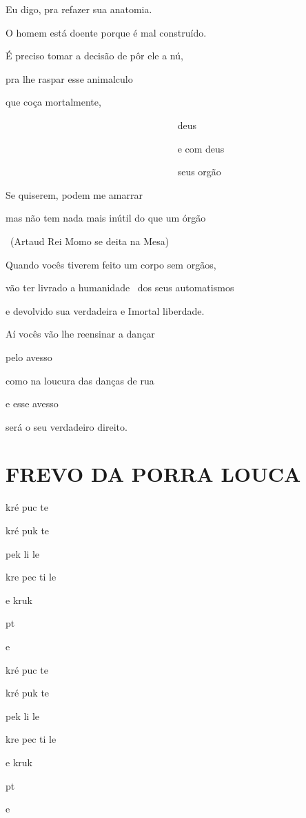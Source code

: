 Eu digo, pra refazer sua anatomia.

O homem está doente porque é mal construído.

É preciso tomar a decisão de pôr ele a nú,

pra lhe raspar esse animalculo


que coça mortalmente,

~~~~~~~~~~~~~~~~~~~~~~~~~~~~~~~~~~~ deus

~~~~~~~~~~~~~~~~~~~~~~~~~~~~~~~~~~~ e com deus

~~~~~~~~~~~~~~~~~~~~~~~~~~~~~~~~~~~ seus orgão

Se quiserem, podem me amarrar

mas não tem nada mais inútil do que um órgão

~(Artaud Rei Momo se deita na Mesa)

Quando vocês tiverem feito um corpo sem orgãos,

vão ter livrado a humanidade ~dos seus automatismos

e devolvido sua verdadeira e Imortal liberdade.

Aí vocês vão lhe reensinar a dançar

pelo avesso

como na loucura das danças de rua

e esse avesso

será o seu verdadeiro direito.


\section*{FREVO DA PORRA LOUCA}

\begin{center}
kré puc te

kré puk te

pek li le

kre pec ti le

e kruk

pt

e

kré puc te

kré puk te

pek li le

kre pec ti le

e kruk

pt

e
\end{center}

